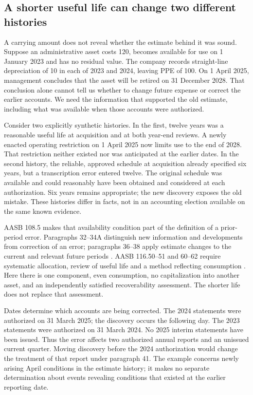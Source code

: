 \subsection{A shorter useful life can change two different histories}
\label{sec:error-estimate-bridge}

A carrying amount does not reveal whether the estimate behind it was sound.
Suppose an administrative asset costs 120, becomes available for use on
1 January 2023 and has no residual value. The company records straight-line
depreciation of 10 in each of 2023 and 2024, leaving PPE of 100. On 1 April
2025, management concludes that the asset will be retired on 31 December
2028. That conclusion alone cannot tell us whether to change future expense
or correct the earlier accounts. We need the information that supported the
old estimate, including what was available when those accounts were
authorized.

Consider two explicitly synthetic histories. In the first, twelve years was
a reasonable useful life at acquisition and at both year-end reviews.
A newly enacted operating restriction on 1 April 2025 now limits use to
the end of 2028. That restriction neither existed nor was anticipated at the
earlier dates. In the second history, the reliable, approved schedule at
acquisition already specified six years, but a transcription error entered
twelve. The original schedule was available and could reasonably have been
obtained and considered at each authorization. Six years remains appropriate;
the new discovery exposes the old mistake. These histories differ in facts,
not in an accounting election available on the same known evidence.

AASB 108.5 makes that availability condition part of the definition of a
prior-period error. Paragraphs 32--34A distinguish new information and
developments from correction of an error; paragraphs 36--38 apply estimate
changes to the current and relevant future periods
\citep{aasb108comp2022}. AASB 116.50--51 and 60--62 require systematic
allocation, review of useful life and a method reflecting consumption
\citep{aasb116dated}. Here there is one component, even consumption, no
capitalization into another asset, and an independently satisfied
recoverability assessment. The shorter life does not replace that assessment.

Dates determine which accounts are being corrected. The 2024 statements
were authorized on 31 March 2025; the discovery occurs the following day.
The 2023 statements were authorized on 31 March 2024. No 2025 interim
statements have been issued. Thus the error affects two authorized annual
reports and an unissued current quarter. Moving discovery before the 2024
authorization would change the treatment of that report under paragraph 41.
The example concerns newly arising April conditions in the estimate history;
it makes no separate determination about events revealing conditions that
existed at the earlier reporting date.


